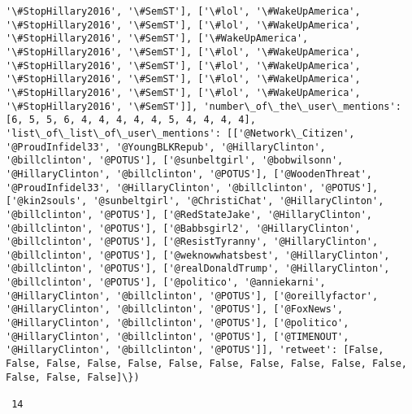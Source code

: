 \documentclass[11pt]{article}
\begin{document}
\begin{Verbatim}[commandchars=\\\{\}]
'\#StopHillary2016', '\#SemST'], ['\#lol', '\#WakeUpAmerica', '\#StopHillary2016', '\#SemST'], ['\#lol', '\#WakeUpAmerica', '\#StopHillary2016', '\#SemST'], ['\#WakeUpAmerica', '\#StopHillary2016', '\#SemST'], ['\#lol', '\#WakeUpAmerica', '\#StopHillary2016', '\#SemST'], ['\#lol', '\#WakeUpAmerica', '\#StopHillary2016', '\#SemST'], ['\#lol', '\#WakeUpAmerica', '\#StopHillary2016', '\#SemST'], ['\#lol', '\#WakeUpAmerica', '\#StopHillary2016', '\#SemST']], 'number\_of\_the\_user\_mentions': [6, 5, 5, 6, 4, 4, 4, 4, 4, 5, 4, 4, 4, 4], 'list\_of\_list\_of\_user\_mentions': [['@Network\_Citizen', '@ProudInfidel33', '@YoungBLKRepub', '@HillaryClinton', '@billclinton', '@POTUS'], ['@sunbeltgirl', '@bobwilsonn', '@HillaryClinton', '@billclinton', '@POTUS'], ['@WoodenThreat', '@ProudInfidel33', '@HillaryClinton', '@billclinton', '@POTUS'], ['@kin2souls', '@sunbeltgirl', '@ChristiChat', '@HillaryClinton', '@billclinton', '@POTUS'], ['@RedStateJake', '@HillaryClinton', '@billclinton', '@POTUS'], ['@Babbsgirl2', '@HillaryClinton', '@billclinton', '@POTUS'], ['@ResistTyranny', '@HillaryClinton', '@billclinton', '@POTUS'], ['@weknowwhatsbest', '@HillaryClinton', '@billclinton', '@POTUS'], ['@realDonaldTrump', '@HillaryClinton', '@billclinton', '@POTUS'], ['@politico', '@anniekarni', '@HillaryClinton', '@billclinton', '@POTUS'], ['@oreillyfactor', '@HillaryClinton', '@billclinton', '@POTUS'], ['@FoxNews', '@HillaryClinton', '@billclinton', '@POTUS'], ['@politico', '@HillaryClinton', '@billclinton', '@POTUS'], ['@TIMENOUT', '@HillaryClinton', '@billclinton', '@POTUS']], 'retweet': [False, False, False, False, False, False, False, False, False, False, False, False, False, False]\})

 14
 


\end{Verbatim}
\end{document}
